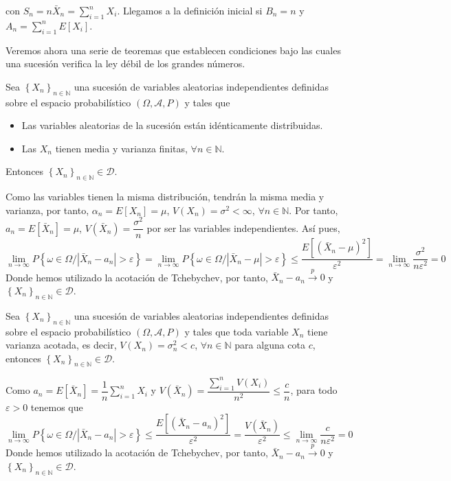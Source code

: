 con $S_n=n\bar{X}_n=\sum_{i=1}^{n}X_i$. Llegamos a la definici\'on inicial si $B_n=n$ y $A_n=\sum_{i=1}^{n}E[X_i]$.

Veremos ahora una serie de teoremas que establecen condiciones bajo las cuales una sucesi\'on verifica la ley d\'ebil de los grandes n\'umeros.

\begin{teorema}
Sea $ \left\{X_n\right\}_{n\in\mathbb{N}}$ una sucesi\'on de variables aleatorias independientes definidas sobre el espacio probabil\'istico $\left(\Omega,\mathcal{A}, P\right) $ y tales que 
\begin{itemize}
\item Las variables aleatorias de la sucesi\'on est\'an id\'enticamente distribuidas.
\item Las $X_n$ tienen media y varianza finitas, $\forall n\in\mathbb{N}$.
\end{itemize}
Entonces $ \left\{X_n\right\}_{n\in\mathbb{N}}\in\mathscr{D}$.
\end{teorema}

Como las variables tienen la misma distribuci\'on, tendr\'an la misma media y varianza, por tanto, $\alpha_n=E[X_n]=\mu$, $V(X_n)=\sigma^2<\infty$, $\forall n\in\mathbb{N}$. Por tanto, $a_n=E[\bar{X}_n]=\mu$, $V(\bar{X}_n)=\dfrac{\sigma^2}{n}$ por ser las variables independientes. As\'i pues,
\begin{equation*}
\lim_{n\to\infty}P\left\{\omega\in\Omega/\left|\bar{X}_n-a_n\right|>\varepsilon\right\}=\lim_{n\to\infty}P\left\{\omega\in\Omega/\left|\bar{X}_n-\mu\right|>\varepsilon\right\}\le \dfrac{E[(\bar{X}_n-\mu)^2]}{\varepsilon^2}=\lim_{n\to\infty}\dfrac{\sigma^2}{n\varepsilon^2}=0
\end{equation*}
Donde hemos utilizado la acotaci\'on de Tchebychev, por tanto, $\bar{X}_n-a_n\overset{p}{\to} 0$ y $\left\{X_n\right\}_{n\in\mathbb{N}}\in\mathscr{D}$.

\begin{teorema}[Tchebychev]
Sea $ \left\{X_n\right\}_{n\in\mathbb{N}}$ una sucesi\'on de variables aleatorias independientes definidas sobre el espacio probabil\'istico $\left(\Omega,\mathcal{A}, P\right) $ y tales que toda variable $X_n$ tiene varianza acotada, es decir, $V(X_n)=\sigma_n^2<c$, $\forall n\in\mathbb{N}$ para alguna cota $c$, entonces $ \left\{X_n\right\}_{n\in\mathbb{N}}\in\mathscr{D}$.
\end{teorema}
Como $a_n=E[\bar{X}_n]=\dfrac{1}{n}\sum_{i=1}^nX_i$ y $V(\bar{X}_n)=\dfrac{\sum_{i=1}^nV(X_i)}{n^2}\leq\dfrac{c}{n}$, para todo $\varepsilon>0$ tenemos que
\begin{equation*}
\lim_{n\to\infty}P\left\{\omega\in\Omega/\left|\bar{X}_n-a_n\right|>\varepsilon\right\}\le \dfrac{E[(\bar{X}_n-a_n)^2]}{\varepsilon^2}=\dfrac{V(\bar{X}_n)}{\varepsilon^2}\leq\lim_{n\to\infty}\dfrac{c}{n\varepsilon^2}=0
\end{equation*}
Donde hemos utilizado la acotaci\'on de Tchebychev, por tanto, $\bar{X}_n-a_n\overset{p}{\to} 0$ y $\left\{X_n\right\}_{n\in\mathbb{N}}\in\mathscr{D}$.


